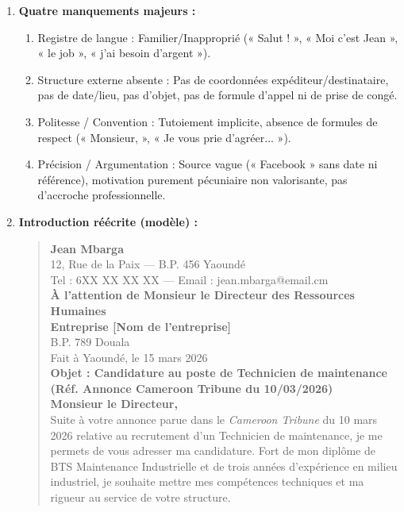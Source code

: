 \documentclass[11pt]{article}
\newcommand{\cle}[1]{{\popxbold\color{popdark}#1}}
\begin{document}
\begin{corrige}
\begin{enumerate}
    \item \textbf{Quatre manquements majeurs :}
    \begin{enumerate}
        \item \cle{Registre de langue} : Familier/Inapproprié (« Salut ! », « Moi c'est Jean », « le job », « j'ai besoin d'argent »).
        \item \cle{Structure externe absente} : Pas de coordonnées expéditeur/destinataire, pas de date/lieu, pas d'objet, pas de formule d'appel ni de prise de congé.
        \item \cle{Politesse / Convention} : Tutoiement implicite, absence de formules de respect (« Monsieur, », « Je vous prie d'agréer... »).
        \item \cle{Précision / Argumentation} : Source vague (« Facebook » sans date ni référence), motivation purement pécuniaire non valorisante, pas d'accroche professionnelle.
    \end{enumerate}
    \item \textbf{Introduction réécrite (modèle) :}
    \begin{quote}
    \textbf{Jean Mbarga} \\
    12, Rue de la Paix — B.P. 456 Yaoundé \\
    Tel : 6XX XX XX XX — Email : jean.mbarga@email.cm \\[0.5em]
    \textbf{À l'attention de Monsieur le Directeur des Ressources Humaines} \\
    \textbf{Entreprise [Nom de l'entreprise]} \\
    B.P. 789 Douala \\[0.5em]
    Fait à Yaoundé, le 15 mars 2026 \\[0.5em]
    \textbf{Objet : Candidature au poste de Technicien de maintenance (Réf. Annonce Cameroon Tribune du 10/03/2026)} \\[0.5em]
    \textbf{Monsieur le Directeur,} \\[0.5em]
    Suite à votre annonce parue dans le \emph{Cameroon Tribune} du 10 mars 2026 relative au recrutement d'un Technicien de maintenance, je me permets de vous adresser ma candidature. Fort de mon diplôme de BTS Maintenance Industrielle et de trois années d'expérience en milieu industriel, je souhaite mettre mes compétences techniques et ma rigueur au service de votre structure.
    \end{quote}
\end{enumerate}
\end{corrige}
\end{document}
